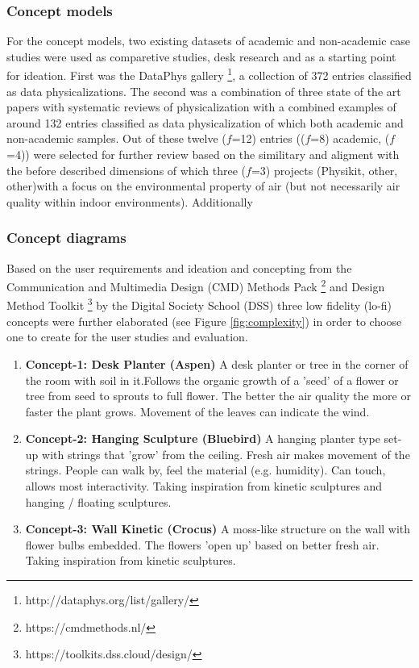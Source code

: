 \subsubsection{Concept models}

For the concept models, two existing datasets of academic and non-academic case studies were used as comparetive studies, desk research and as a starting point for ideation. First was the DataPhys gallery \footnote{http://dataphys.org/list/gallery/}, a collection of 372 entries classified as data physicalizations. The second was a combination of three state of the art papers with systematic reviews of physicalization with a combined examples of around 132 entries classified as data physicalization of which both academic and non-academic samples. Out of these twelve ($f$=12) entries (($f$=8) academic, ($f$=4)) were selected for further review based on the similitary and aligment with the  before described dimensions of which three ($f$=3) projects (Physikit, other, other)with a focus on the environmental property of air (but not necessarily air quality within indoor environments). Additionally 

\subsubsection{Concept diagrams}

Based on the user requirements and ideation and concepting from the Communication and Multimedia Design (CMD) Methods Pack \footnote{https://cmdmethods.nl/} and Design Method Toolkit \footnote{https://toolkits.dss.cloud/design/} by the Digital Society School (DSS) three low fidelity (lo-fi) concepts were further elaborated (see Figure \ref{fig:complexity}) in order to choose one to create for the user studies and evaluation. 


\begin{enumerate}
  \item \textbf{Concept-1: Desk Planter (Aspen)}
      A desk planter or tree in the corner of the room with soil in it.Follows the organic growth of a 'seed' of a flower or tree from seed to sprouts to full flower. The better the air quality the more or faster the plant grows. Movement of the leaves can indicate the wind.

  \item \textbf{Concept-2: Hanging Sculpture (Bluebird)}
      A hanging planter type set-up with strings that 'grow' from the ceiling. Fresh air makes movement of the strings. People can walk by, feel the material (e.g. humidity). Can touch, allows most interactivity. Taking inspiration from kinetic sculptures and hanging / floating sculptures.

  \item \textbf{Concept-3: Wall Kinetic (Crocus)}
      A moss-like structure on the wall with flower bulbs embedded. The flowers 'open up' based on better fresh air. Taking inspiration from kinetic sculptures.
\end{enumerate}


